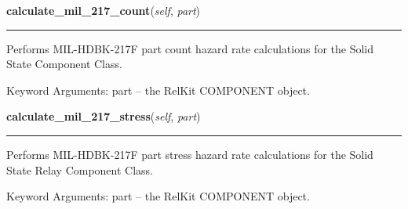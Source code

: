     \label{reliafree:relays:relay:SolidState:calculate_mil_217_count}

    \vspace{0.5ex}

\hspace{.8\funcindent}\begin{boxedminipage}{\funcwidth}

    \raggedright \textbf{calculate\_mil\_217\_count}(\textit{self}, \textit{part})

    \vspace{-1.5ex}

    \rule{\textwidth}{0.5\fboxrule}
\setlength{\parskip}{2ex}
    Performs MIL-HDBK-217F part count hazard rate calculations for the 
    Solid State Component Class.

    Keyword Arguments: part -- the RelKit COMPONENT object.

\setlength{\parskip}{1ex}
    \end{boxedminipage}

    \label{reliafree:relays:relay:SolidState:calculate_mil_217_stress}

    \vspace{0.5ex}

\hspace{.8\funcindent}\begin{boxedminipage}{\funcwidth}

    \raggedright \textbf{calculate\_mil\_217\_stress}(\textit{self}, \textit{part})

    \vspace{-1.5ex}

    \rule{\textwidth}{0.5\fboxrule}
\setlength{\parskip}{2ex}
    Performs MIL-HDBK-217F part stress hazard rate calculations for the 
    Solid State Relay Component Class.

    Keyword Arguments: part -- the RelKit COMPONENT object.

\setlength{\parskip}{1ex}
    \end{boxedminipage}


